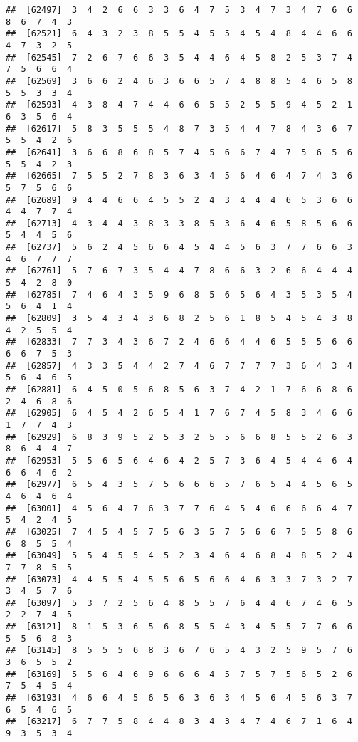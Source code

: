 \documentclass[
]{book}
\begin{document}
\begin{verbatim}
##  [62497]  3  4  2  6  6  3  3  6  4  7  5  3  4  7  3  4  7  6  6  8  6  7  4  3
##  [62521]  6  4  3  2  3  8  5  5  4  5  5  4  5  4  8  4  4  6  6  4  7  3  2  5
##  [62545]  7  2  6  7  6  6  3  5  4  4  6  4  5  8  2  5  3  7  4  7  5  6  6  4
##  [62569]  3  6  6  2  4  6  3  6  6  5  7  4  8  8  5  4  6  5  8  5  5  3  3  4
##  [62593]  4  3  8  4  7  4  4  6  6  5  5  2  5  5  9  4  5  2  1  6  3  5  6  4
##  [62617]  5  8  3  5  5  5  4  8  7  3  5  4  4  7  8  4  3  6  7  5  5  4  2  6
##  [62641]  3  6  6  8  6  8  5  7  4  5  6  6  7  4  7  5  6  5  6  5  5  4  2  3
##  [62665]  7  5  5  2  7  8  3  6  3  4  5  6  4  6  4  7  4  3  6  5  7  5  6  6
##  [62689]  9  4  4  6  6  4  5  5  2  4  3  4  4  4  6  5  3  6  6  4  4  7  7  4
##  [62713]  4  3  4  4  3  8  3  3  8  5  3  6  4  6  5  8  5  6  6  5  4  4  5  6
##  [62737]  5  6  2  4  5  6  6  4  5  4  4  5  6  3  7  7  6  6  3  4  6  7  7  7
##  [62761]  5  7  6  7  3  5  4  4  7  8  6  6  3  2  6  6  4  4  4  5  4  2  8  0
##  [62785]  7  4  6  4  3  5  9  6  8  5  6  5  6  4  3  5  3  5  4  5  6  4  1  4
##  [62809]  3  5  4  3  4  3  6  8  2  5  6  1  8  5  4  5  4  3  8  4  2  5  5  4
##  [62833]  7  7  3  4  3  6  7  2  4  6  6  4  4  6  5  5  5  6  6  6  6  7  5  3
##  [62857]  4  3  3  5  4  4  2  7  4  6  7  7  7  7  3  6  4  3  4  5  6  4  6  5
##  [62881]  6  4  5  0  5  6  8  5  6  3  7  4  2  1  7  6  6  8  6  2  4  6  8  6
##  [62905]  6  4  5  4  2  6  5  4  1  7  6  7  4  5  8  3  4  6  6  1  7  7  4  3
##  [62929]  6  8  3  9  5  2  5  3  2  5  5  6  6  8  5  5  2  6  3  8  6  4  4  7
##  [62953]  5  5  6  5  6  4  6  4  2  5  7  3  6  4  5  4  4  6  4  6  6  4  6  2
##  [62977]  6  5  4  3  5  7  5  6  6  6  5  7  6  5  4  4  5  6  5  4  6  4  6  4
##  [63001]  4  5  6  4  7  6  3  7  7  6  4  5  4  6  6  6  6  4  7  5  4  2  4  5
##  [63025]  7  4  5  4  5  7  5  6  3  5  7  5  6  6  7  5  5  8  6  6  8  5  5  4
##  [63049]  5  5  4  5  5  4  5  2  3  4  6  4  6  8  4  8  5  2  4  7  7  8  5  5
##  [63073]  4  4  5  5  4  5  5  6  5  6  6  4  6  3  3  7  3  2  7  3  4  5  7  6
##  [63097]  5  3  7  2  5  6  4  8  5  5  7  6  4  4  6  7  4  6  5  2  2  7  4  5
##  [63121]  8  1  5  3  6  5  6  8  5  5  4  3  4  5  5  7  7  6  6  5  5  6  8  3
##  [63145]  8  5  5  5  6  8  3  6  7  6  5  4  3  2  5  9  5  7  6  3  6  5  5  2
##  [63169]  5  5  6  4  6  9  6  6  6  4  5  7  5  7  5  6  5  2  6  7  5  4  5  4
##  [63193]  4  6  6  4  5  6  5  6  3  6  3  4  5  6  4  5  6  3  7  6  5  4  6  5
##  [63217]  6  7  7  5  8  4  4  8  3  4  3  4  7  4  6  7  1  6  4  9  3  5  3  4

\end{verbatim}
\end{document}
